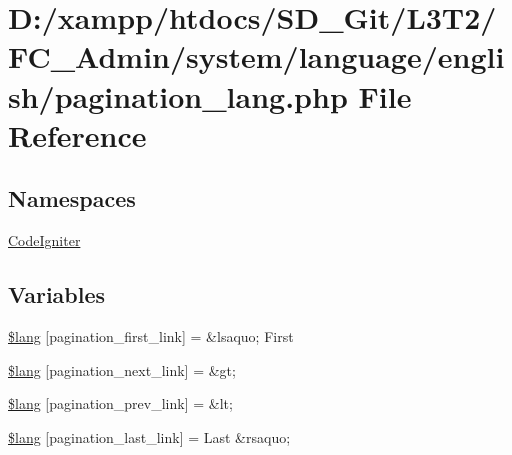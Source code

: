 \hypertarget{_admin_2system_2language_2english_2pagination__lang_8php}{}\section{D\+:/xampp/htdocs/\+S\+D\+\_\+\+Git/\+L3\+T2/\+F\+C\+\_\+\+Admin/system/language/english/pagination\+\_\+lang.php File Reference}
\label{_admin_2system_2language_2english_2pagination__lang_8php}
\subsection*{Namespaces}
\begin{DoxyCompactItemize}
\item 
 \hyperlink{namespace_code_igniter}{Code\+Igniter}
\end{DoxyCompactItemize}
\subsection*{Variables}
\begin{DoxyCompactItemize}
\item 
\hyperlink{_admin_2system_2language_2english_2pagination__lang_8php_a9786c3ca317374647c440f713c686d49}{\$lang} \mbox{[}\textquotesingle{}pagination\+\_\+first\+\_\+link\textquotesingle{}\mbox{]} = \textquotesingle{}\&lsaquo; First\textquotesingle{}
\item 
\hyperlink{_admin_2system_2language_2english_2pagination__lang_8php_a485f808a96ff78250ab760d638f3ddc7}{\$lang} \mbox{[}\textquotesingle{}pagination\+\_\+next\+\_\+link\textquotesingle{}\mbox{]} = \textquotesingle{}\&gt;\textquotesingle{}
\item 
\hyperlink{_admin_2system_2language_2english_2pagination__lang_8php_a5388708db9e549b8ec5ec4cd49073c84}{\$lang} \mbox{[}\textquotesingle{}pagination\+\_\+prev\+\_\+link\textquotesingle{}\mbox{]} = \textquotesingle{}\&lt;\textquotesingle{}
\item 
\hyperlink{_admin_2system_2language_2english_2pagination__lang_8php_aa4f66cf3f9c7c4b479f01776761faea6}{\$lang} \mbox{[}\textquotesingle{}pagination\+\_\+last\+\_\+link\textquotesingle{}\mbox{]} = \textquotesingle{}Last \&rsaquo;\textquotesingle{}
\end{DoxyCompactItemize}


